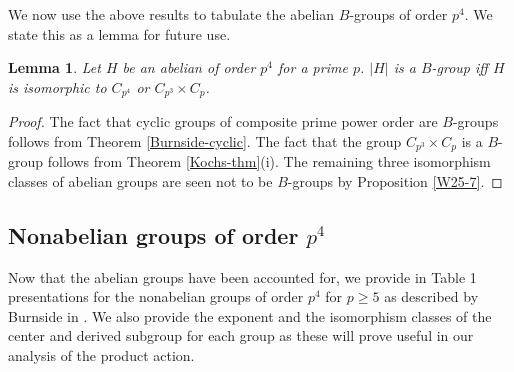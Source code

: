 \documentclass[12pt]{amsart}
\newtheorem{lemma}[theorem]{Lemma}
\theoremstyle{definition}
\begin{document}
	We now use the above results to tabulate the abelian $B$-groups of order $p^4$. We state this as a lemma for future use.
	\begin{lemma}
		Let $H$ be an abelian of order $p^4$ for a prime $p$. $|H|$ is a $B$-group iff $H$ is isomorphic to $C_{p^4}$ or $C_{p^3} \times C_p$.
	\end{lemma}
	\begin{proof}
		The fact that cyclic groups of composite prime power order are $B$-groups follows from Theorem \ref{Burnside-cyclic}. The fact that the group $C_{p^3} \times C_{p}$ is a $B$-group follows from Theorem \ref{Kochs-thm}(i). The remaining three isomorphism classes of abelian groups are seen not to be $B$-groups by Proposition \ref{W25-7}.
	\end{proof}
	
	\subsection{Nonabelian groups of order $p^4$}
	
	Now that the abelian groups have been accounted for, we provide in Table 1 presentations for the nonabelian groups of order $p^4$ for $p \geq 5$ as described by Burnside in \cite[\S117]{Burn}. We also provide the exponent and the isomorphism classes of the center and derived subgroup for each group as these will prove useful in our analysis of the product action.
\end{document}
